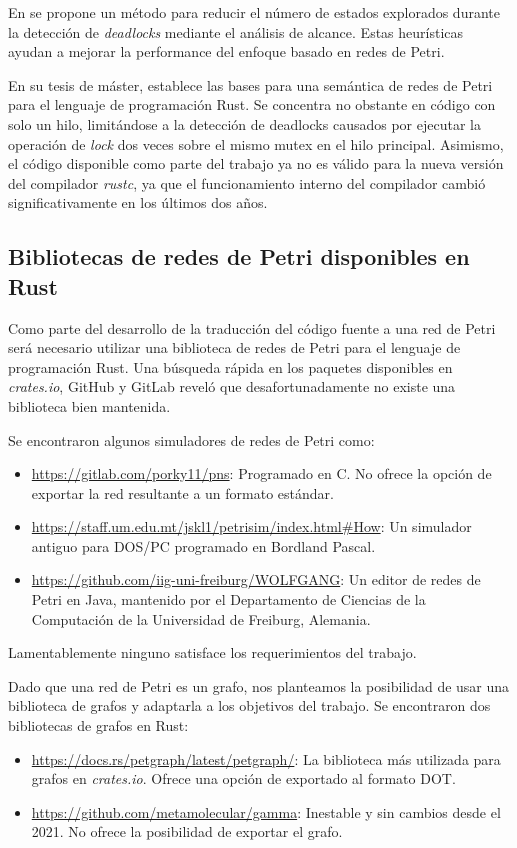\documentclass[12pt]{article}
\begin{document}
En \cite{karatkevich-grobelna2014} se propone un método para reducir el número de estados explorados
durante la detección de \textit{deadlocks} mediante el análisis de alcance.
Estas heurísticas ayudan a mejorar la performance del enfoque basado en redes de Petri.

En su tesis de máster, \cite{meyer2020} establece las bases para una semántica de redes de Petri para el lenguaje de programación Rust.
Se concentra no obstante en código con solo un hilo, limitándose a la detección de deadlocks causados
por ejecutar la operación de \textit{lock} dos veces sobre el mismo mutex en el hilo principal.
Asimismo, el código disponible como parte del trabajo ya no es válido para la nueva versión del compilador \textit{rustc},
ya que el funcionamiento interno del compilador cambió significativamente en los últimos dos años.

\subsection{Bibliotecas de redes de Petri disponibles en Rust}
\label{petri-net-libs}

Como parte del desarrollo de la traducción del código fuente a una red de Petri será necesario utilizar una biblioteca de redes de Petri para el lenguaje de programación Rust.
Una búsqueda rápida en los paquetes disponibles en \textit{crates.io}, GitHub y GitLab reveló que desafortunadamente no existe una biblioteca bien mantenida.

Se encontraron algunos simuladores de redes de Petri como:
\begin{itemize}
    \item \url{https://gitlab.com/porky11/pns}: Programado en C. No ofrece la opción de exportar la red resultante a un formato estándar.
    \item \url{https://staff.um.edu.mt/jskl1/petrisim/index.html#How}: Un simulador antiguo para DOS/PC programado en Bordland Pascal.
    \item \url{https://github.com/iig-uni-freiburg/WOLFGANG}: Un editor de redes de Petri en Java, mantenido por el Departamento de Ciencias de la Computación de la Universidad de Freiburg, Alemania.
\end{itemize}
Lamentablemente ninguno satisface los requerimientos del trabajo.

Dado que una red de Petri es un grafo, nos planteamos la posibilidad de usar una biblioteca de grafos y adaptarla a los objetivos del trabajo.
Se encontraron dos bibliotecas de grafos en Rust:
\begin{itemize}
    \item \url{https://docs.rs/petgraph/latest/petgraph/}: La biblioteca más utilizada para grafos en \textit{crates.io}. Ofrece una opción de exportado al formato DOT.
    \item \url{https://github.com/metamolecular/gamma}: Inestable y sin cambios desde el 2021. No ofrece la posibilidad de exportar el grafo.
\end{itemize}
\end{document}
